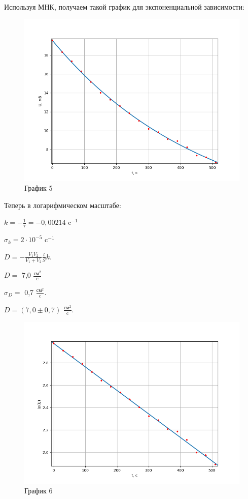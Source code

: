 \documentclass[a4paper,12pt]{article} %
\begin{document}
\begin{enumerate}
Используя МНК, получаем такой график для экспоненциальной зависимости:
\begin{figure}[h!]
	\centering
	\includegraphics[scale=0.8]{График2(эксп).png}
	\caption*{График 5}
\end{figure}

Теперь в логарифмическом масштабе:

$k = -\frac{1}{\tau} = -0,00214$ c$^{-1}$

$\sigma_{k} = 2\cdot 10^{-5}$ c$^{-1}$

$D = - \frac{V_{1}V_{2}}{V_{1} + V_{2}}\frac{l}{S}k$.

$D = $ 7,0 $\frac{\text{см}^2}{\text{c}}$

$\sigma_{D} = $ 0,7 $\frac{\text{см}^2}{\text{c}}$.
\vspace{15mm}

$D = (7,0 \pm 0,7)$ $\frac{\text{см}^2}{\text{c}}$.
\newpage
\begin{figure}[h!]
	\centering
	\includegraphics[scale=0.8]{График2(лин).png}
	\caption*{График 6}
\end{figure}


\end{enumerate}
\end{document}
